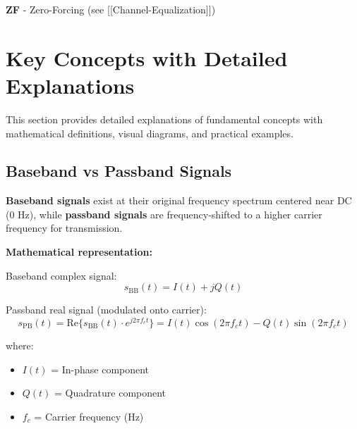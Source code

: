 \textbf{ZF} - Zero-Forcing (see {[}{[}Channel-Equalization{]}{]})

\section{Key Concepts with Detailed Explanations}\label{sec:key-concepts}

This section provides detailed explanations of fundamental concepts with mathematical definitions, visual diagrams, and practical examples.

\subsection{Baseband vs Passband Signals}

\textbf{Baseband signals} exist at their original frequency spectrum centered near DC (0 Hz), while \textbf{passband signals} are frequency-shifted to a higher carrier frequency for transmission.

\textbf{Mathematical representation:}

Baseband complex signal:
\begin{equation}
s_{\text{BB}}(t) = I(t) + jQ(t)
\label{eq:baseband}
\end{equation}

Passband real signal (modulated onto carrier):
\begin{equation}
s_{\text{PB}}(t) = \text{Re}\{s_{\text{BB}}(t) \cdot e^{j2\pi f_c t}\} = I(t)\cos(2\pi f_c t) - Q(t)\sin(2\pi f_c t)
\label{eq:passband}
\end{equation}

where:
\begin{itemize}
\item $I(t)$ = In-phase component
\item $Q(t)$ = Quadrature component  
\item $f_c$ = Carrier frequency (Hz)
\end{itemize}

